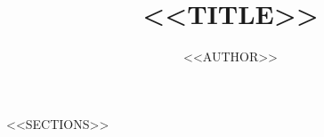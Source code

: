 \documentclass{article}
\title{<<TITLE>>}
\author{<<AUTHOR>>}
\begin{document}
\maketitle

<<SECTIONS>>
\end{document}

